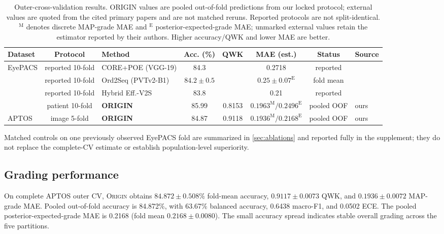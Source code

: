 \documentclass[10pt,twocolumn,letterpaper]{article}
\newcommand{\method}{\textsc{Origin}\xspace}
\newcommand{\NA}{\textemdash}
\begin{document}
\begin{table}[t]
  \centering
  \caption{Outer-cross-validation results.  ORIGIN values are pooled
  out-of-fold predictions from our locked protocol; external values are quoted
  from the cited primary papers and are not matched reruns.  Reported protocols
  are not split-identical.  $^{\mathrm{M}}$ denotes discrete MAP-grade MAE and
  $^{\mathrm{E}}$
  posterior-expected-grade MAE; unmarked external values retain the estimator
  reported by their authors.  Higher accuracy/QWK and lower MAE are better.}
  \label{tab:main-results}
  \small
  \setlength{\tabcolsep}{4pt}
  \begin{tabular}{@{}lclccccl@{}}
    \toprule
    Dataset & Protocol & Method & Acc. (\%) & QWK & MAE (est.) & Status & Source \\
    \midrule
    \multirow{4}{*}{EyePACS}
      & reported 10-fold & CORE+POE (VGG-19) & 84.3 & \NA & 0.2718
      & reported & \cite{lei2024core} \\
      & reported 10-fold & Ord2Seq (PVTv2-B1) & $84.2\!\pm\!0.5$ & \NA &
      $0.25\!\pm\!0.07^{\mathrm{E}}$ & fold mean & \cite{wang2023ord2seq} \\
      & reported 10-fold & Hybrid Eff.-V2S & 83.8 & \NA & 0.21
      & reported & \cite{saleem2025hybrid} \\
      & patient 10-fold & \textbf{ORIGIN} & 85.99 & 0.8153 &
      $0.1963^{\mathrm{M}}/0.2496^{\mathrm{E}}$
      & pooled OOF & ours \\
    \midrule
    APTOS
      & image 5-fold & \textbf{ORIGIN} & 84.87 & 0.9118 &
      $0.1936^{\mathrm{M}}/0.2168^{\mathrm{E}}$
      & pooled OOF & ours \\
    \bottomrule
  \end{tabular}
  \par\smallskip
  \parbox{0.94\textwidth}{\centering Matched controls on one previously
  observed EyePACS fold are summarized in \cref{sec:ablations} and reported
  fully in the supplement; they do not replace the complete-CV estimate or
  establish population-level superiority.}
\end{table}

\subsection{Grading performance}

On complete APTOS outer CV, \method obtains
$84.872\!\pm\!0.508$\% fold-mean accuracy, $0.9117\!\pm\!0.0073$ QWK, and
$0.1936\!\pm\!0.0072$ MAP-grade MAE.  Pooled out-of-fold accuracy is 84.872\%,
with 63.67\% balanced accuracy, 0.6438 macro-F1, and 0.0502 ECE.  The pooled
posterior-expected-grade MAE is 0.2168 (fold mean
$0.2168\!\pm\!0.0080$).  The small accuracy spread indicates stable overall
grading across the five partitions.
\end{document}
